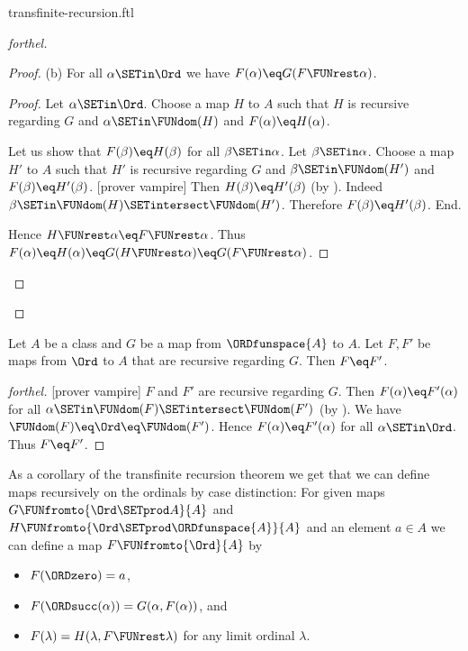\documentclass{stex}
\begin{document}
\begin{smodule}{transfinite-recursion.ftl}
\begin{proof}[forthel]
\begin{proof}
    (b) For all $\alpha \SETin \Ord$ we have $F(\alpha) \eq G(F \FUNrest \alpha)$.
    \begin{proof}
      Let $\alpha \SETin \Ord$.
      Choose a map $H$ to $A$ such that $H$ is recursive regarding $G$ and $\alpha \SETin \FUNdom(H)$ and $F(\alpha) \eq H(\alpha)$.

      Let us show that $F(\beta) \eq H(\beta)$ for all $\beta \SETin \alpha$.
        Let $\beta \SETin \alpha$.
        Choose a map $H'$ to $A$ such that $H'$ is recursive regarding $G$ and $\beta \SETin \FUNdom(H')$ and $F(\beta) \eq H'(\beta)$.
        [prover vampire]
        Then $H(\beta) \eq H'(\beta)$ (by ).
        Indeed $\beta \SETin \FUNdom(H) \SETintersect \FUNdom(H')$.
        Therefore $F(\beta) \eq H'(\beta)$.
      End.

      Hence $H \FUNrest \alpha \eq F \FUNrest \alpha$.
      Thus $F(\alpha)
        \eq H(\alpha)
        \eq G(H \FUNrest \alpha)
        \eq G(F \FUNrest \alpha)$.
    \end{proof}
  \end{proof}
\end{proof}

\begin{theorem}[forthel,title=Transfinite Recursion Theorem: Uniqueness,id=transfinite_recursion_uniqueness]
  Let $A$ be a class and $G$ be a map from $\ORDfunspace{A}$ to $A$.
  Let $F, F'$ be maps from $\Ord$ to $A$ that are recursive regarding $G$.
  Then $F \eq F'$.
\end{theorem}
\begin{proof}[forthel]
  [prover vampire]
  $F$ and $F'$ are recursive regarding $G$.
  Then $F(\alpha) \eq F'(\alpha)$ for all $\alpha \SETin \FUNdom(F) \SETintersect \FUNdom(F')$ (by ).
  We have $\FUNdom(F) \eq \Ord \eq \FUNdom(F')$.
  Hence $F(\alpha) \eq F'(\alpha)$ for all $\alpha \SETin \Ord$.
  Thus $F \eq F'$.
\end{proof}

As a corollary of the transfinite recursion theorem we get that we can
define maps recursively on the ordinals by case distinction:
For given maps $G \FUNfromto{\Ord \SETprod A}{A}$ and
$H \FUNfromto{\Ord \SETprod \ORDfunspace{A}}{A}$ and an element $a \in A$ we
can define a map $F \FUNfromto{\Ord}{A}$ by
\begin{itemize}
  \item $F(\ORDzero) = a$,
  \item $F(\ORDsucc(\alpha)) = G(\alpha, F(\alpha))$, and
  \item $F(\lambda) = H(\lambda, F \FUNrest \lambda)$
    for any limit ordinal $\lambda$.
\end{itemize}


\end{smodule}
\end{document}
